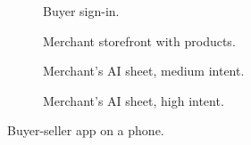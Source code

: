 \begin{figure}[htbp]
  \centering
  \begin{subfigure}[t]{0.235\textwidth}
    \centering
    \caption{Buyer sign-in.}
  \end{subfigure}
  \hfill
  \begin{subfigure}[t]{0.235\textwidth}
    \centering
    \caption{Merchant storefront with products.}
  \end{subfigure}
  \hfill
  \begin{subfigure}[t]{0.235\textwidth}
    \centering
    \caption{Merchant's AI sheet, medium intent.}
  \end{subfigure}
  \hfill
  \begin{subfigure}[t]{0.235\textwidth}
    \centering
    \caption{Merchant's AI sheet, high intent.}
  \end{subfigure}
  \caption{Buyer-seller app on a phone.}
  \label{fig:ui-merchant-mobile}
\end{figure}